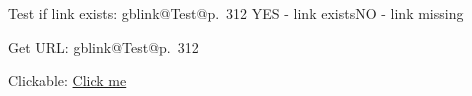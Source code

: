 \documentclass{article}
\makeatletter
\newcommand{\ifgblink}[2]{%
  \ifcsname gblink@#1@#2\endcsname
    \expandafter\@firstoftwo
  \else
    \expandafter\@secondoftwo
  \fi
}
\newcommand{\getgblink}[2]{%
  \csname gblink@#1@#2\endcsname
}
\makeatother
\begin{document}
Test if link exists:
\ifgblink{Test}{p.~312}{YES - link exists}{NO - link missing}

Get URL: \getgblink{Test}{p.~312}

Clickable: \href{\getgblink{Test}{p.~312}}{Click me}
\end{document}
